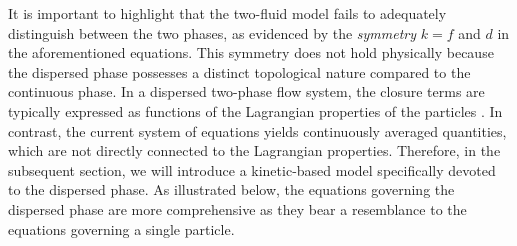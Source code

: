 It is important to highlight that the two-fluid model fails to adequately distinguish between the two phases, as evidenced by the \textit{symmetry} $k = f$ and $d$ in the aforementioned equations. This symmetry does not hold physically because the dispersed phase possesses a distinct topological nature compared to the continuous phase. 
In a dispersed two-phase flow system, the closure terms are typically expressed as functions of the Lagrangian properties of the particles \citep{jackson2000}. In contrast, the current system of equations yields continuously averaged quantities, which are not directly connected to the Lagrangian properties.
Therefore, in the subsequent section, we will introduce a kinetic-based model specifically devoted to the dispersed phase. 
As illustrated below, the equations governing the dispersed phase are more comprehensive as they bear a resemblance to the equations governing a single particle.

